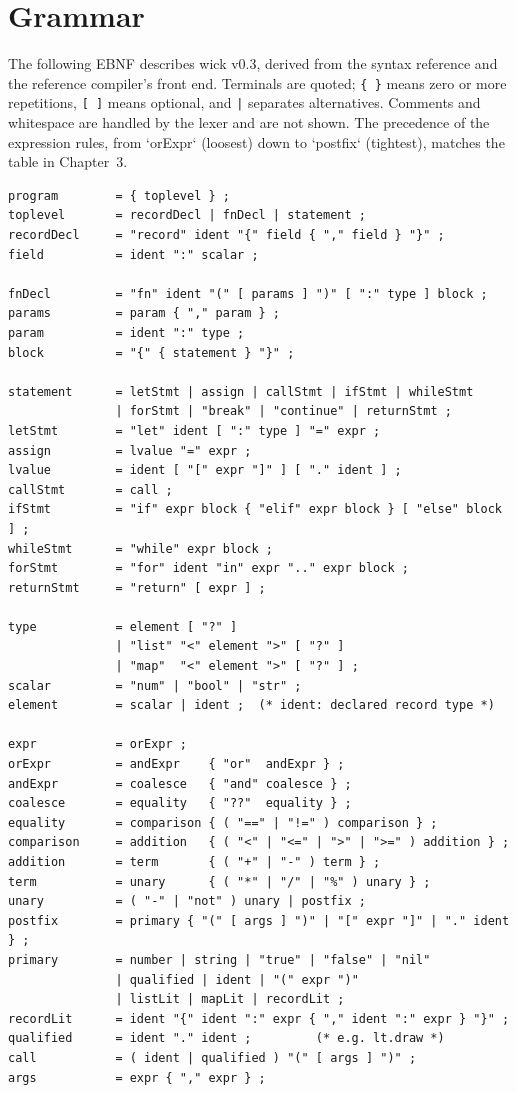 \chapter{Grammar}

The following EBNF describes wick v0.3, derived from the syntax reference and
the reference compiler's front end. Terminals are quoted; \texttt{\{\ \}}
means zero or more repetitions, \texttt{[\ ]} means optional, and \texttt{|}
separates alternatives. Comments and whitespace are handled by the lexer and
are not shown. The precedence of the expression rules, from `orExpr` (loosest)
down to `postfix` (tightest), matches the table in Chapter~3.

\begin{lstlisting}[basicstyle=\ttfamily\small,keywordstyle={}]
program        = { toplevel } ;
toplevel       = recordDecl | fnDecl | statement ;
recordDecl     = "record" ident "{" field { "," field } "}" ;
field          = ident ":" scalar ;

fnDecl         = "fn" ident "(" [ params ] ")" [ ":" type ] block ;
params         = param { "," param } ;
param          = ident ":" type ;
block          = "{" { statement } "}" ;

statement      = letStmt | assign | callStmt | ifStmt | whileStmt
               | forStmt | "break" | "continue" | returnStmt ;
letStmt        = "let" ident [ ":" type ] "=" expr ;
assign         = lvalue "=" expr ;
lvalue         = ident [ "[" expr "]" ] [ "." ident ] ;
callStmt       = call ;
ifStmt         = "if" expr block { "elif" expr block } [ "else" block ] ;
whileStmt      = "while" expr block ;
forStmt        = "for" ident "in" expr ".." expr block ;
returnStmt     = "return" [ expr ] ;

type           = element [ "?" ]
               | "list" "<" element ">" [ "?" ]
               | "map"  "<" element ">" [ "?" ] ;
scalar         = "num" | "bool" | "str" ;
element        = scalar | ident ;  (* ident: declared record type *)

expr           = orExpr ;
orExpr         = andExpr    { "or"  andExpr } ;
andExpr        = coalesce   { "and" coalesce } ;
coalesce       = equality   { "??"  equality } ;
equality       = comparison { ( "==" | "!=" ) comparison } ;
comparison     = addition   { ( "<" | "<=" | ">" | ">=" ) addition } ;
addition       = term       { ( "+" | "-" ) term } ;
term           = unary      { ( "*" | "/" | "%" ) unary } ;
unary          = ( "-" | "not" ) unary | postfix ;
postfix        = primary { "(" [ args ] ")" | "[" expr "]" | "." ident } ;
primary        = number | string | "true" | "false" | "nil"
               | qualified | ident | "(" expr ")"
               | listLit | mapLit | recordLit ;
recordLit      = ident "{" ident ":" expr { "," ident ":" expr } "}" ;
qualified      = ident "." ident ;         (* e.g. lt.draw *)
call           = ( ident | qualified ) "(" [ args ] ")" ;
args           = expr { "," expr } ;


\end{lstlisting}
